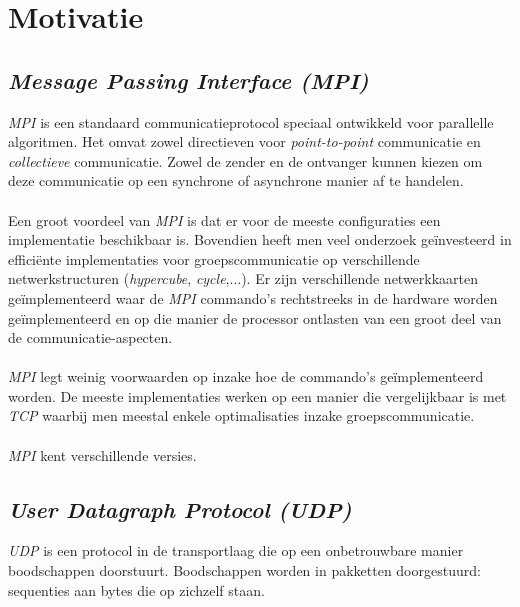 \section{Motivatie}

\subsection{\emph{Message Passing Interface (MPI)}}

\emph{MPI} is een standaard communicatieprotocol speciaal ontwikkeld voor parallelle algoritmen. Het omvat zowel directieven voor \emph{point-to-point} communicatie en \emph{collectieve} communicatie. Zowel de zender en de ontvanger kunnen kiezen om deze communicatie op een synchrone of asynchrone manier af te handelen.

\paragraph{}
Een groot voordeel van \emph{MPI} is dat er voor de meeste configuraties een implementatie beschikbaar is. Bovendien heeft men veel onderzoek ge\"investeerd in effici\"ente implementaties voor groepscommunicatie op verschillende netwerkstructuren (\emph{hypercube}, \emph{cycle},...). Er zijn verschillende netwerkkaarten ge\"implementeerd waar de \emph{MPI} commando's rechtstreeks in de hardware worden ge\"implementeerd en op die manier de processor ontlasten van een groot deel van de communicatie-aspecten.

\paragraph{}
\emph{MPI} legt weinig voorwaarden op inzake hoe de commando's ge\"implementeerd worden. De meeste implementaties werken op een manier die vergelijkbaar is met \emph{TCP} waarbij men meestal enkele optimalisaties inzake groepscommunicatie.

\paragraph{}
\emph{MPI} kent verschillende versies. %

\subsection{\emph{User Datagraph Protocol (UDP)}}

\emph{UDP} is een protocol in de transportlaag die op een onbetrouwbare manier boodschappen doorstuurt. Boodschappen worden in pakketten doorgestuurd: sequenties aan bytes die op zichzelf staan.

